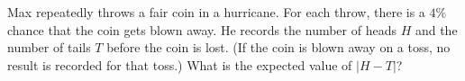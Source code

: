 Max repeatedly throws a fair coin in a hurricane. For each throw, there is a $4\%$ chance that the coin gets blown away. He records the number of heads $H$ and the number of tails $T$ before the coin is lost. (If the coin is blown away on a toss, no result is recorded for that toss.) What is the expected value of $|H-T|$?